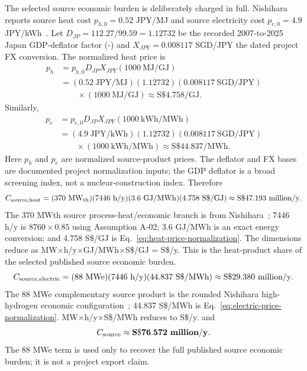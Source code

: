 The selected source economic burden is deliberately charged in full. Nishihara reports source heat cost $p_{h,0}=0.52$ JPY/MJ and source electricity cost $p_{e,0}=4.9$ JPY/kWh~\cite{nishihara2007potential}. Let $D_{JP}=112.27/99.59=1.12732$ be the recorded 2007-to-2025 Japan GDP-deflator factor (-) and $X_{JPY}=0.008117$ SGD/JPY the dated project FX conversion. The normalized heat price is
\begin{equation}\label{eq:heat-price-normalization}
\begin{aligned}
p_h&=p_{h,0}D_{JP}X_{JPY}(1000~\mathrm{MJ/GJ})\\
&=(0.52~\mathrm{JPY/MJ})(1.12732)(0.008117~\mathrm{SGD/JPY})\\
&\qquad\times(1000~\mathrm{MJ/GJ})
\approx\mathrm{S\$}4.758/\mathrm{GJ}.
\end{aligned}
\end{equation}
Similarly,
\begin{equation}\label{eq:electric-price-normalization}
\begin{aligned}
p_e&=p_{e,0}D_{JP}X_{JPY}(1000~\mathrm{kWh/MWh})\\
&=(4.9~\mathrm{JPY/kWh})(1.12732)(0.008117~\mathrm{SGD/JPY})\\
&\qquad\times(1000~\mathrm{kWh/MWh})
\approx\mathrm{S\$}44.837/\mathrm{MWh}.
\end{aligned}
\end{equation}
Here $p_h$ and $p_e$ are normalized source-product prices. The deflator and FX bases are documented project normalization inputs; the GDP deflator is a broad screening index, not a nuclear-construction index. Therefore
\begin{equation}\label{eq:source-heat-cost}
C_{\rm source,heat}
=(370~\mathrm{MW_{th}})(7446~\mathrm{h/y})(3.6~\mathrm{GJ/MWh})(4.758~\mathrm{S\$/GJ})
\approx\mathrm{S\$}47.193~\mathrm{million/y}.
\end{equation}
The 370 MWth source process-heat/economic branch is from Nishihara~\cite{nishihara2007potential}; 7446 h/y is $8760\times0.85$ using Assumption A-02; 3.6 GJ/MWh is an exact energy conversion; and 4.758 S\$/GJ is Eq.~\ref{eq:heat-price-normalization}. The dimensions reduce as MW$\times$h/y$\times$GJ/MWh$\times$S\$/GJ = S\$/y. This is the heat-product share of the selected published source economic burden.
\begin{equation}\label{eq:source-electric-cost}
C_{\rm source,electric}
=(88~\mathrm{MWe})(7446~\mathrm{h/y})(44.837~\mathrm{S\$/MWh})
\approx\mathrm{S\$}29.380~\mathrm{million/y}.
\end{equation}
The 88 MWe complementary source product is the rounded Nishihara high-hydrogen economic configuration~\cite{nishihara2007potential}; 44.837 S\$/MWh is Eq.~\ref{eq:electric-price-normalization}. MW$\times$h/y$\times$S\$/MWh reduces to S\$/y.
and
\begin{equation}\label{eq:source-total-cost}
C_{\rm source}\approx\mathbf{S\$76.572~million/y}.
\end{equation}
The 88 MWe term is used only to recover the full published source economic burden; it is not a project export claim.

